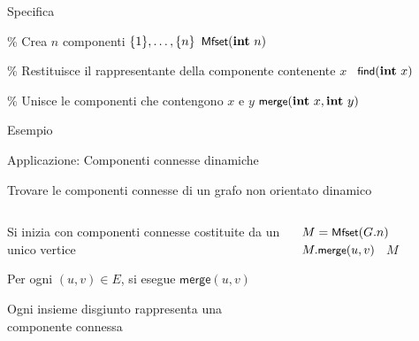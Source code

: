 \begin{frame}{Specifica}

\vspace{-9pt}
\begin{Procedure}
\caption[A]{\mfset}

\BlankLine
\% Crea $n$ componenti $\{1\}, \ldots, \{n\}$\;
\mfset $\mfconstructor(\INTEGER\ n)$\;

\BlankLine
\% Restituisce il rappresentante della componente contenente $x$\;
\INTEGER\ $\mffind(\INTEGER\ x)$\;

\BlankLine
\% Unisce le componenti che contengono $x$ e $y$\;
$\mfmerge(\INTEGER\ x, \INTEGER\ y)$\;
 
\BlankLine
\end{Procedure}

\end{frame}

\begin{frame}{Esempio}
\vspace{-9pt}
\end{frame}

\begin{frame}{Applicazione: Componenti connesse dinamiche}

\vspace{-9pt}
\begin{myboxtitle}[Problema]
Trovare le componenti connesse di un grafo non orientato \alert{dinamico}
\end{myboxtitle}

\begin{columns}[T]
\vspace{-9pt}
\begin{myboxtitle}[Algoritmo]
\BIL
\item Si inizia con componenti connesse costituite da un unico vertice
\item Per ogni $(u,v) \in E$, si esegue $\textsf{merge}(u, v)$ 
\item Ogni insieme disgiunto rappresenta
una componente connessa
\EIL
\end{myboxtitle}
\vspace{-9pt}
\begin{Procedure}
\caption[A]{\mfset\ \connectedcomponents($\Graph\ G$)}

\mfset $M = \textsf{{\small Mfset}}(G.n)$\;
{
  {
    $M.\textsf{{\small merge}}(u, v)$\;
  }
}
\Return\ $M$\;
\end{Procedure}

\end{columns}

\end{frame}

